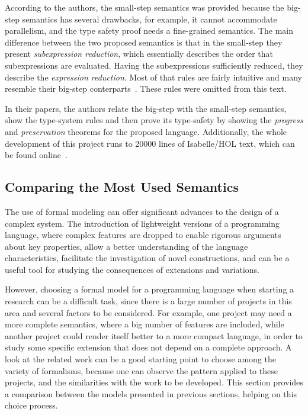 \documentclass[tese,capa,english]{texufpel}
\begin{document}
According to the authors, the small-step semantics was provided because the big-step semantics has several drawbacks, for example, it cannot accommodate parallelism, and the type safety proof needs a fine-grained semantics. The main difference between the two proposed semantics is that in the small-step they present \emph{subexpression reduction}, which essentially describes the order that subexpressions are evaluated. Having the subexpressions sufficiently reduced, they describe the \emph{expression reduction}. Most of that rules are fairly intuitive and many resemble their big-step conterparts~\cite{Klein:2006:MMJ:1146809.1146811}. These rules were omitted from this text.

In their papers, the authors relate the big-step with the small-step semantics, show the type-system rules and then prove its type-safety by showing the \emph{progress} and \emph{preservation} theorems for the proposed language. Additionally, the whole development of this project runs to 20000 lines of Isabelle/HOL text, which can be found online~\cite{jinja2017}.

\subsection{Comparing the Most Used Semantics}

The use of formal modeling can offer significant advances to the design of a complex system. The introduction of lightweight versions of a programming language, where complex features are dropped to enable rigorous arguments about key properties, allow a better understanding of the language characteristics, facilitate the investigation of novel constructions, and can be a useful tool for studying the consequences of extensions and variations. 

However, choosing a formal model for a programming language when starting a research can be a difficult task, since there is a large number of projects in this area and several factors to be considered. For example, one project may need a more complete semantics, where a big number of features are included, while another project could render itself better to a more compact language, in order to study some specific extension that does not depend on a complete approach. A look at the related work can be a good starting point to choose among the variety of formalisms, because one can observe the pattern applied to these projects, and the similarities with the work to be developed. This section provides a comparison between the models presented in previous sections, helping on this choice process.
\end{document}
